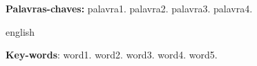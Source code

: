\documentclass[
	12pt,				%
	openright,			%
	oneside,			%
	a4paper,			%
	english,			%
	french,				%
	spanish,			%
	brazil,				%
	]{abntex2}
\begin{document}
\begin{agradecimentos}

\end{agradecimentos}

\begin{resumo}
\noindent

 \vspace{\onelineskip}
    
 \noindent
 \textbf{Palavras-chaves:} palavra1. palavra2. palavra3. palavra4.
\end{resumo}

\begin{resumo}[Abstract]
 \begin{otherlanguage*}{english}
   \vspace{\onelineskip}
    \noindent 

   \vspace{\onelineskip}
   
   \noindent  \textbf{Key-words}:  word1. word2. word3. word4. word5.
 \end{otherlanguage*}
\end{resumo}

\listoffigures*
\cleardoublepage

\listoftables*
\cleardoublepage
\end{document}

